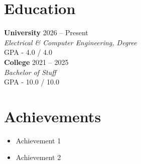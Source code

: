 \documentclass[a4paper,10pt]{article}
\begin{document}
\section{Education}

\textbf{University } \hfill 2026 -- Present \\
\textit{ Electrical \& Computer Engineering, Degree } \\
GPA - 4.0 / 4.0 \\[4pt]
\textbf{College } \hfill 2021 -- 2025 \\
\textit{ Bachelor of Stuff } \\
GPA - 10.0 / 10.0 \\[4pt]

\section{Achievements}

\begin{itemize}
\item Achievement 1
\item Achievement 2
\end{itemize}
\end{document}
